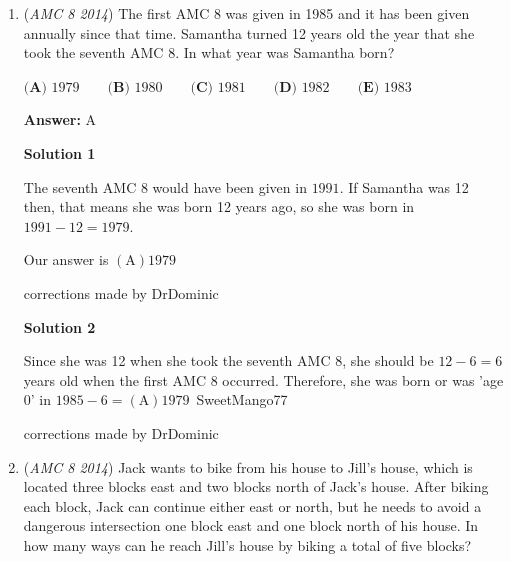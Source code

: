 \begin{enumerate}
 


 



\textbf{Solution 2}

If you ever completely freeze on a multiple-choice geometry question, use the diagram to eliminate choices:1. A straight horizontal line is \(180^{\circ }\).2. Look at \(\angle BDC\). It's clearly a sharp, acute corner (less than \(90^{\circ }\)). In fact, because the other two angles are a wide \(70^{\circ }\), that corner has to be small (\(40^{\circ }\)).3. Since a straight line is \(180^{\circ }\), subtracting that small corner leaves a massive obtuse angle.4. Looking at your options: \(100^{\circ }\) and \(120^{\circ }\) are way too small. If you had to guess between the remaining options, \(140^{\circ }\) is a very clean, common test-maker answer compared to \(135^{\circ }\).~Aarnavisthebest

 


	\item (\textit{AMC 8 2014}) The first AMC 8 was given in 1985 and it has been given annually since that time. Samantha turned 12 years old the year that she took the seventh AMC 8. In what year was Samantha born?


 $\textbf{(A) }1979\qquad\textbf{(B) }1980\qquad\textbf{(C) }1981\qquad\textbf{(D) }1982\qquad \textbf{(E) }1983$

 \textbf{Answer: }A



\textbf{Solution 1}

The seventh AMC 8 would have been given in $1991$. If Samantha was 12 then, that means she was born 12 years ago, so she was born in $1991-12=1979$.

 Our answer is $\boxed{(\text{A})1979}$

 corrections made by DrDominic

 



\textbf{Solution 2}

Since she was 12 when she took the seventh AMC 8, she should be $12-6=6$ years old when the first AMC 8 occurred. Therefore, she was born or was 'age 0' in $1985-6=\boxed{\left(\text{A}\right)1979}$~SweetMango77

 corrections made by DrDominic

 


 


	\item (\textit{AMC 8 2014}) Jack wants to bike from his house to Jill's house, which is located three blocks east and two blocks north of Jack's house. After biking each block, Jack can continue either east or north, but he needs to avoid a dangerous intersection one block east and one block north of his house. In how many ways can he reach Jill's house by biking a total of five blocks?



\end{enumerate}
